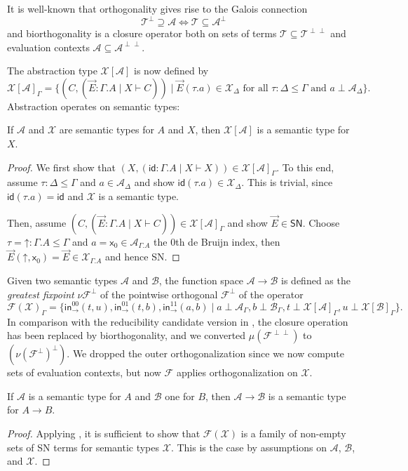 \documentclass[a4paper,USenglish,cleveref, autoref, thm-restate]{lipics-v2019}
\newcommand{\tid}{\mathsf{id}}
\newcommand{\x}{\mathsf{x}}
\newcommand{\tin}{\ensuremath{\mathsf{in}}}
\newcommand{\inn}[2]{\ensuremath{\tin_{#1}^{#2}}}
\newcommand{\A}{\mathcal{A}}
\newcommand{\B}{\mathcal{B}}
\newcommand{\F}{\mathcal{F}}
\newcommand{\T}{\mathcal{T}}
\newcommand{\X}{\mathcal{X}}
\newcommand{\SN}{\mathsf{SN}}
\newcommand{\up}{\mathord{\uparrow}}
\begin{document}
It is well-known that orthogonality gives rise to the Galois
connection
\[
  \T^\perp \supseteq \A \iff \T \subseteq \A^\perp
\]
and biorthogonality is a closure operator both on sets of terms $\T
\subseteq \T^{\perp\perp}$ and evaluation contexts
$\A \subseteq \A^{\perp\perp}$.

The abstraction type $\X[\A]$ is now defined by
\[
  \X[\A]_\Gamma =
  \{ (C, (\vec E : \Gamma.A \mid X \vdash C))
     \mid \vec E (\tau.a) \in \X_\Delta
     \mbox{ for all } \tau : \Delta \leq \Gamma
     \mbox{ and } a \perp \A_\Delta
  \}
  .
\]
Abstraction operates on semantic types:
\begin{lemma}
  \label{lem:absrev}
  If $\A$ and $\X$ are semantic types for $A$ and $X$, then $\X[\A]$
  is a semantic type for $X$.
\end{lemma}
\begin{proof}
  We first show that
  $(X, (\tid : \Gamma.A \mid X \vdash X)) \in \X[\A]_\Gamma$.
  To this end, assume $\tau : \Delta \leq \Gamma$ and $a \in
  \A_\Delta$ and show $\tid(\tau.a) \in \X_\Delta$.  This is trivial,
  since $\tid(\tau.a) = \tid$ and $\X$ is a semantic type.

  Then, assume $(C, (\vec E : \Gamma.A \mid X \vdash C)) \in
  \X[\A]_\Gamma$ and show $\vec E \in \SN$.
  Choose $\tau = \up : \Gamma.A \leq \Gamma$ and $a = \x_0 \in
  \A_{\Gamma.A}$ the 0th de Bruijn index, then $\vec E (\up,\x_0) =
  \vec E \in \X_{\Gamma.A}$ and hence SN.
\end{proof}
Given two semantic types $\A$ and $\B$, the function space $\A \to \B$
is defined as the \emph{greatest fixpoint} $\nu \F^\perp$ of the
pointwise orthogonal $\F^\perp$ of the operator
\[
  \F(\X)_\Gamma =
  \{
    \inn\to{00}(t,u),
    \inn\to{01}(t,b),
    \inn\to{11}(a,b) \mid
      a \perp \A_\Gamma,
      b \perp \B_\Gamma,
      t \perp \X[\A]_\Gamma,
      u \perp \X[\B]_\Gamma
  \}
  .
\]
In comparison with the reducibility candidate version in
, the closure operation has been replaced by
biorthogonality, and we converted $\mu(\F^{\perp\perp})$
to $(\nu(\F^\perp)^\perp)$.  We dropped the outer orthogonalization since
we now compute sets of evaluation contexts, but now $\F$ applies
orthogonalization on $\X$.

\begin{lemma}
  \label{lem:funrev}
  If $\A$ is a semantic type for $A$ and $\B$ one for $B$, then $\A
  \to \B$ is a semantic type for $A \to B$.
\end{lemma}
\begin{proof}
  Applying ,
  it is sufficient to show that $\F(\X)$ is a family of non-empty sets
  of SN terms for semantic types $\X$.
  This is the case by assumptions on $\A$, $\B$, and $\X$.
\end{proof}
\end{document}
